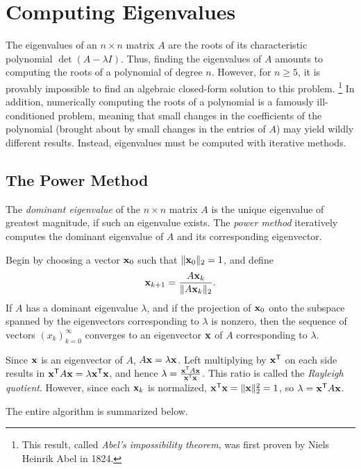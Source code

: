 \section*{Computing Eigenvalues} %

The eigenvalues of an $n \times n$ matrix $A$ are the roots of its characteristic polynomial $\det(A - \lambda I)$.
Thus, finding the eigenvalues of $A$ amounts to computing the roots of a polynomial of degree $n$.
However, for $n \ge 5$, it is provably impossible to find an algebraic closed-form solution to this problem.%
\footnote{This result, called \emph{Abel's impossibility theorem}, was first proven by Niels Heinrik Abel in 1824.}
In addition, numerically computing the roots of a polynomial is a famously ill-conditioned problem, meaning that small changes in the coefficients of the polynomial (brought about by small changes in the entries of $A$) may yield wildly different results.
Instead, eigenvalues must be computed with iterative methods.

\subsection*{The Power Method} %

The \emph{dominant eigenvalue} of the $n \times n$ matrix $A$ is the unique eigenvalue of greatest magnitude, if such an eigenvalue exists.
The \emph{power method} iteratively computes the dominant eigenvalue of $A$ and its corresponding eigenvector.

Begin by choosing a vector $\mathbf{x}_0$ such that $\|\mathbf{x}_0\|_2=1$, and define
\[
\mathbf{x}_{k+1} = \frac{A\mathbf{x}_k}{\|A\mathbf{x}_k\|_2}.
\]
If $A$ has a dominant eigenvalue $\lambda$, and if the projection of $\mathbf{x}_0$ onto the subspace spanned by the eigenvectors corresponding to $\lambda$ is nonzero, then the sequence of vectors $(x_k)_{k=0}^\infty$ converges to an eigenvector $\mathbf{x}$ of $A$ corresponding to $\lambda$.

Since $\mathbf{x}$ is an eigenvector of $A$, $A\mathbf{x} = \lambda \mathbf{x}$.
Left multiplying by $\mathbf{x}^{\mathsf T}$ on each side results in $\mathbf{x}^{\mathsf T} A\mathbf{x} = \lambda \mathbf{x}^{\mathsf T}\mathbf{x}$, and hence $\lambda = \frac{\mathbf{x}^{\mathsf T} A\mathbf{x}}{\mathbf{x}^{\mathsf T}\mathbf{x}}$.
This ratio is called the \emph{Rayleigh quotient}.
However, since each $\mathbf{x}_k$ is normalized, $\mathbf{x}^{\mathsf T}\mathbf{x} = \|\mathbf{x}\|_2^2 = 1$, so $\lambda = \mathbf{x}^{\mathsf T} A\mathbf{x}$.

The entire algorithm is summarized below.

